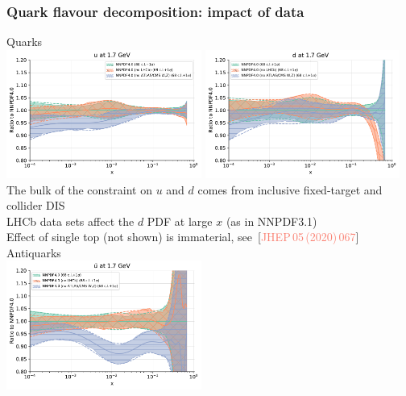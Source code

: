 \documentclass{beamer}
\begin{document}
\begin{frame}
 \frametitle{Quark flavour decomposition: impact of data}
 \footnotesize
 \begin{overlayarea}{\textwidth}{5.5cm}
  {
   \centering
   Quarks\\
   \includegraphics[width=0.48\textwidth]{plots/flavour_u}
   \includegraphics[width=0.48\textwidth]{plots/flavour_d}\\
   \vspace{0.1cm}
   The bulk of the constraint on $u$ and $d$ comes from inclusive fixed-target and collider DIS\\
   \vspace{0.1cm}
   LHCb data sets affect the $d$ PDF at large $x$ (as in NNPDF3.1)\\
   \vspace{0.1cm}
   Effect of single top (not shown) is immaterial, see~{\tiny{[{\textcolor{salmon}{JHEP\,05\,(2020)\,067}}]}}\\
  }
  {
   \centering
   Antiquarks\\
   \includegraphics[width=0.48\textwidth]{plots/flavour_baru}
}
\end{overlayarea}
\end{frame}
\end{document}
